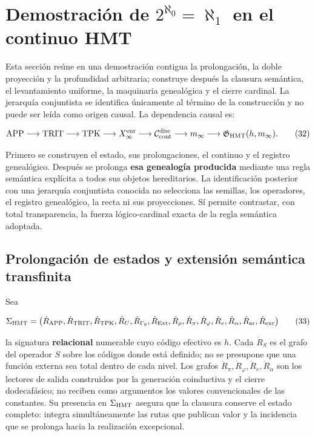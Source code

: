 \section{Demostración de \texorpdfstring{\(2^{\aleph_0}=\aleph_1\)}{2 elevado a aleph cero igual a aleph uno} en el continuo HMT}
\label{sec:cierre-cardinal-nativo}

Esta sección reúne en una demostración contigua la prolongación, la doble
proyección y la profundidad arbitraria; construye después la clausura
semántica, el levantamiento uniforme, la maquinaria genealógica y el cierre
cardinal. La jerarquía conjuntista se identifica únicamente al término de la
construcción y no puede ser leída como origen causal. La dependencia causal es:

\[
 \mathrm{APP}\longrightarrow\mathrm{TRIT}\longrightarrow\mathrm{TPK}
 \longrightarrow X_\infty^{\rm enr}
 \longrightarrow\mathcal C_{\rm cont}^{\rm disc}
 \longrightarrow m_\infty
 \longrightarrow\mathfrak G_{\rm HMT}(h,m_\infty).
\tag{32}\label{eq:ch-cadena-causal}
\]

Primero se construyen el estado, sus prolongaciones, el continuo y el registro genealógico.
Después se prolonga \textbf{esa genealogía producida} mediante una regla semántica
explícita a todos sus objetos hereditarios. La identificación posterior con
una jerarquía conjuntista conocida no selecciona las semillas, los operadores,
el registro genealógico, la recta ni sus proyecciones. Sí permite contrastar, con total
transparencia, la fuerza lógico-cardinal exacta de la regla semántica adoptada.

\subsection{Prolongación de estados y extensión semántica transfinita}

Sea

\[
 \Sigma_{\rm HMT}
 =\bigl(\dot R_{\rm APP},\dot R_{\rm TRIT},\dot R_{\rm TPK},
 \dot R_{U},\dot R_{\Gamma_9},\dot R_{\rm Ext},\dot R_\rho,
 \dot R_{\pi},\dot R_{\varphi},\dot R_e,\dot R_{\alpha},
 \dot R_{\rm ar},\dot R_{\rm exc}\bigr)
\tag{33}\label{eq:ch-signatura}
\]

la signatura \textbf{relacional} numerable cuyo código efectivo es \(h\). Cada
\(\dot R_S\) es el grafo del operador \(S\) sobre los códigos donde está
definido; no se presupone que una función externa sea total dentro de cada
nivel. Los grafos \(\dot R_{\pi},\dot R_{\varphi},\dot R_e,\dot R_{\alpha}\)
son los lectores de salida construidos por la generación coinductiva y el
cierre dodecafásico; no reciben como argumentos los valores convencionales de
las constantes. Su presencia en \(\Sigma_{\rm HMT}\) asegura que la clausura
conserve el estado completo: integra simultáneamente las rutas que publican
valor y la incidencia que se prolonga hacia la realización excepcional.

